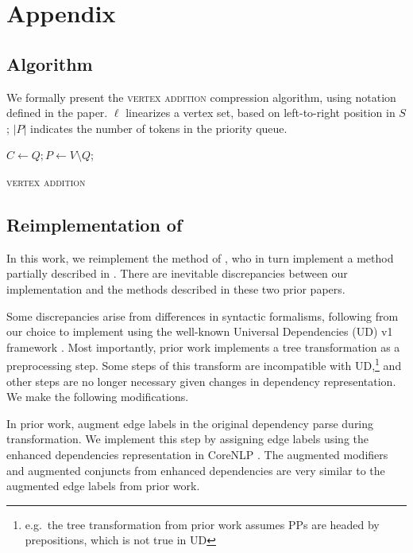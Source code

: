 \appendix

\section{Appendix}

\subsection{Algorithm}
We formally present the \textsc{vertex addition} compression algorithm, using notation defined in the paper. $\ell$ linearizes a vertex set, based on left-to-right position in $S$; $|P|$ indicates the number of tokens in the priority queue.

\begin{algorithm}[]
\SetAlgoLined
{}
 $ C \gets Q;  P \gets V \setminus Q$; \\
 \caption{\textsc{vertex addition}}
\end{algorithm}\label{a:algo}

\subsection{Reimplementation of \citet{filippova2013overcoming}}

In this work, we reimplement the method of \citet{filippova2013overcoming}, who in turn implement a method partially described in \citet{filippova2008dependency}.  There are inevitable discrepancies between our implementation and the methods described in these two prior papers.  

Some discrepancies arise from differences in syntactic formalisms, following from our choice to implement using the well-known Universal Dependencies (UD) v1 framework \cite{Nivre2016UniversalDV}. Most importantly, prior work implements a tree transformation as a preprocessing step. Some steps of this transform are incompatible with UD,\footnote{e.g.\ the tree transformation from prior work assumes PPs are headed by prepositions, which is not true in UD} and other steps are no longer necessary given changes in dependency representation. We make the following modifications.

In prior work, \citet{filippova2013overcoming} augment edge labels in the original dependency parse during transformation. We implement this step by assigning edge labels using the enhanced dependencies representation in CoreNLP \cite{Schuster2016EnhancedEU}. The augmented modifiers and augmented conjuncts from enhanced dependencies are very similar to the augmented edge labels from prior work.

